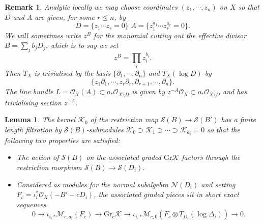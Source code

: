 \documentclass[10pt,a4paper]{amsart}
\newtheorem{lemma}[theorem]{Lemma}
\newtheorem*{remark}{Remark}
\newcommand{\OO}{\mathcal{O}}
\renewcommand{\leq}{\leqslant}
\begin{document}
\begin{remark}\label{coord} Analytic locally we may choose coordinates $(z_1,\cdots,z_n)$ on $X$ so that $D$ and $A$ are given, for some $r\leq n$, by $$D=\{z_1\cdots z_r=0\}\,\,A=\{z_1^{a_1}\cdots z_r^{a_r}=0\}.$$ We will sometimes write $z^B$ for the monomial cutting out the effective divisor $B=\sum_j b_jD_j$, which is to say we set $$z^B=\prod_i z_i^{b_i}.$$ Then $T_X$ is trivialised by the basis $\{\partial_1,\cdots,\partial_n\}$ and $T_X(\log D)$ by $$\{z_1\partial_1,\cdots,z_r\partial_r,\partial_{r+1},\cdots,\partial_n\}.$$ The line bundle $L=\OO_X(A)\subset o_*\OO_{X\setminus D}$ is given by $z^{-A}\OO_X\subset o_*\OO_{X\setminus D}$ and has trivialising section $z^{-A}.$ \end{remark}

\begin{lemma}\label{prelim} The kernel $\mathcal{K}_0$ of the restriction map $\mathcal{S}(B)\to\mathcal{S}(B')$ has a finite length filtration by $\mathcal{S}(B)$-submodules $\mathcal{K}_0\supset\mathcal{K}_1\supset\cdots\supset\mathcal{K}_{a_i}=0$ so that the following two properties are satisfied:
\begin{itemize}
\item The action of $\mathcal{S}(B)$ on the associated graded $\mathrm{Gr}\mathcal{K}$ factors through the restriction morphism $\mathcal{S}(B)\to\mathcal{S}(D_i)$.
\item Considered as modules for the normal subalgebra $\mathcal{N}(D_i)$ and setting $F_c=\iota_i^*\OO_X(-B'-cD_i)$, the associated graded pieces sit in short exact sequences
$$0\to\iota_{i,*}\mathcal{M}_{c,a_i}(F_c)\to\mathrm{Gr}_c\mathcal{K}\to\iota_{i,*}\mathcal{M}_{c,0}(F_c\otimes T_{D_i}(\log\Delta_i))\to0.$$
\end{itemize}
\end{lemma}
\end{document}
